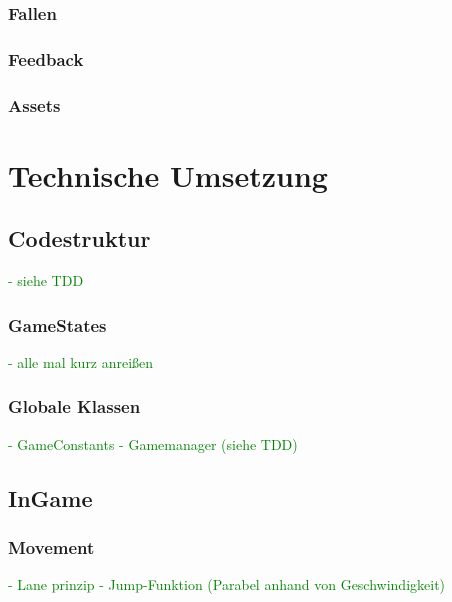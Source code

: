 \documentclass{article}
\begin{document}
\subsubsection{Fallen}

\vspace{1cm}
\subsubsection{Feedback}

\vspace{1cm}
\subsubsection{Assets}

\newpage
\section{Technische Umsetzung}

\vspace{2cm}
\subsection{Codestruktur}
\textcolor{green}{- siehe TDD}

\vspace{1cm}
\subsubsection{GameStates}
\textcolor{green}{- alle mal kurz anreißen}

\vspace{1cm}
\subsubsection{Globale Klassen}
\textcolor{green}{- GameConstants \newline
- Gamemanager (siehe TDD)}

\vspace{2cm}
\subsection{InGame}

\vspace{1cm}
\subsubsection{Movement}
\textcolor{green}{- Lane prinzip \newline
- Jump-Funktion (Parabel anhand von Geschwindigkeit)}
\end{document}
